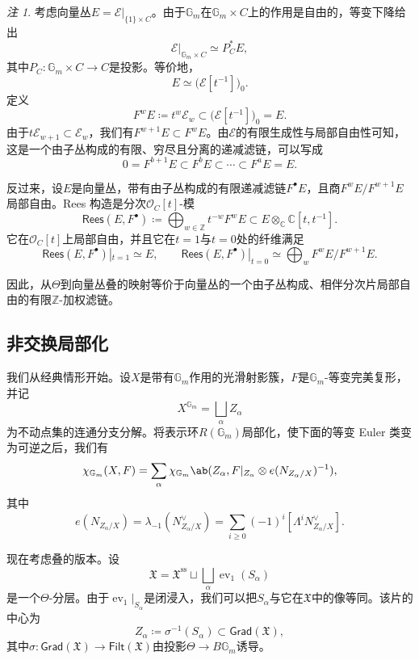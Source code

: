 \documentclass{amsart}
\theoremstyle{definition}
\theoremstyle{remark}
\newtheorem{rmk}[thm]{注}
\theoremstyle{plain}
\theoremstyle{definition}
\theoremstyle{remark}
\newcommand{\G}{\mathbb{G}}
\newcommand{\C}{\mathbb{C}}
\newcommand{\Z}{\mathbb{Z}}
\newcommand{\mc}[1]{\mathcal{#1}}
\newcommand{\mf}[1]{\mathfrak{#1}}
\newcommand{\mr}[1]{\mathrm{#1}}
\newcommand{\ms}[1]{\mathsf{#1}}
\newcommand{\1}{\mathbf{1}}
\newcommand{\2}{\mathbf{2}}
\newcommand{\3}{\mathbf{3}}
\DeclareMathOperator{\ev}{ev}
\begin{document}
\begin{rmk}
    考虑向量丛\(E=\mc{E}|_{\{1\}\times C}\)。由于\(\G_m\)在\(\G_m\times C\)上的作用是自由的，等变下降给出
    \[
        \mc{E}|_{\G_m\times C}\simeq P_C^*E,
    \]
    其中\(P_C\colon\G_m\times C\to C\)是投影。等价地，
    \[
        E\simeq\big(\mc{E}[t^{-1}]\big)_0.
    \]
    定义
    \[
        F^wE\coloneqq t^w\mc{E}_w\subset\big(\mc{E}[t^{-1}]\big)_0=E.
    \]
    由于\(t\mc{E}_{w+1}\subset\mc{E}_w\)，我们有\(F^{w+1}E\subset F^wE\)。由\(\mc{E}\)的有限生成性与局部自由性可知，这是一个由子丛构成的有限、穷尽且分离的递减滤链，可以写成
    \[
        0=F^{b+1}E\subset F^bE\subset\cdots\subset F^aE=E.
    \]

    反过来，设\(E\)是向量丛，带有由子丛构成的有限递减滤链\(F^\bullet E\)，且商\(F^wE/F^{w+1}E\)局部自由。Rees 构造是分次\(\mc{O}_C[t]\)-模
    \[
        \ms{Rees}(E,F^\bullet)
        \coloneqq
        \bigoplus_{w\in\Z}t^{-w}F^wE
        \subset
        E\otimes_{\C}\C[t,t^{-1}].
    \]
    它在\(\mc{O}_C[t]\)上局部自由，并且它在\(t=1\)与\(t=0\)处的纤维满足
    \[
        \ms{Rees}(E,F^\bullet)|_{t=1}\simeq E,
        \qquad
        \ms{Rees}(E,F^\bullet)|_{t=0}
        \simeq
        \bigoplus_w F^wE/F^{w+1}E.
    \]
\end{rmk}

因此，从\(\Theta\)到向量丛叠的映射等价于向量丛的一个由子丛构成、相伴分次片局部自由的有限\(\Z\)-加权滤链。


\subsection{非交换局部化}%
\label{sub:Non-abelian localization}

我们从经典情形开始。设\(X\)是带有\(\G_m\)作用的光滑射影簇，\(F\)是\(\G_m\)-等变完美复形，并记
\[
    X^{\G_m}=\bigsqcup_\alpha Z_\alpha
\]
为不动点集的连通分支分解。将表示环\(R(\G_m)\)局部化，使下面的等变 Euler 类变为可逆之后，我们有
\[
    \chi_{\G_m}(X,F)
    =
    \sum_\alpha
    \chi_{\G_m}\ab(
        Z_\alpha,
        F|_{Z_\alpha}\otimes e(N_{Z_\alpha/X})^{-1}
    ),
\]
其中
\[
    e(N_{Z_\alpha/X})
    =
    \lambda_{-1}(N_{Z_\alpha/X}^\vee)
    =
    \sum_{i\geq0}(-1)^i[\Lambda^iN_{Z_\alpha/X}^\vee].
\]

现在考虑叠的版本。设
\[
    \mf{X}
    =
    \mf{X}^{\mr{ss}}
    \sqcup
    \bigsqcup_\alpha\ev_1(S_\alpha)
\]
是一个\(\Theta\)-分层。由于\(\ev_1|_{S_\alpha}\)是闭浸入，我们可以把\(S_\alpha\)与它在\(\mf{X}\)中的像等同。该片的中心为
\[
    Z_\alpha\coloneqq\sigma^{-1}(S_\alpha)\subset\ms{Grad}(\mf{X}),
\]
其中\(\sigma\colon\ms{Grad}(\mf{X})\to\ms{Filt}(\mf{X})\)由投影\(\Theta\to B\G_m\)诱导。
\end{document}
